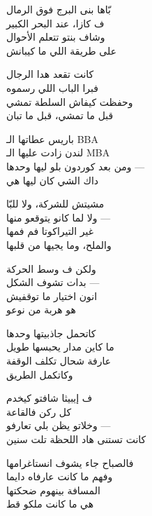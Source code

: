 \begin{lyrics}[12em]

\begin{Arabic}
بّاها بنى البرج فوق الرمال\\
ف كازا، عند البحر الكبير\\
وشاف بنتو تتعلم الأحوال\\
على طريقة اللي ما كيبانش

كانت تقعد هدا الرجال\\
فبرا الباب اللي رسموه\\
وحفظت كيفاش السلطة تمشي\\
قبل ما تمشي، قبل ما تبان
\end{Arabic}

\begin{Arabic}
باريس عطاتها الـ BBA\\
لندن زادت عليها الـ MBA\\
ومن بعد كوردون بلو ليها وحدها —\\
داك الشي كان ليها هي

مشيتش للشركة، ولا للبّا\\
ولا لما كانو يتوقعو منها —\\
غير التيراكوتا فم فمها\\
والملح، وما يجيها من قلبها
\end{Arabic}

\begin{Arabic}
ولكن ف وسط الحركة\\
بدات تشوف الشكل —\\
انون اختيار ما توقفيش\\
هو هربة من نوعو
\end{Arabic}


\begin{Arabic}
كاتحمل جاذبيتها وحدها\\
ما كاين مدار يحبسها طويل\\
عارفة شحال تكلف الوقفة\\
وكاتكمل الطريق
\end{Arabic}

\begin{Arabic}
ف إيبيثا شافتو كيخدم\\
كل ركن فالقاعة\\
وخلاتو يظن بلي تعارفو —\\
كانت تستنى هاد اللحظة تلت سنين

فالصباح جاء يشوف انستاغرامها\\
وفهم ما كانت عارفاه دايما\\
المسافة بينهوم ضحكتها\\
هي ما كانت ملكو قط
\end{Arabic}


\end{lyrics}

